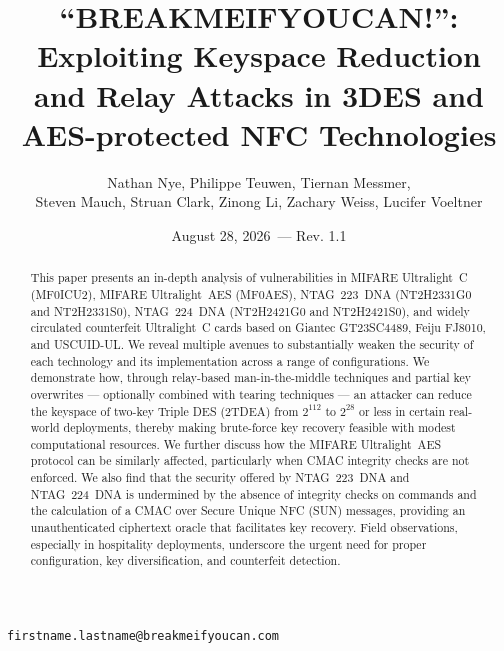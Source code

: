\documentclass[10pt,letterpaper]{article}
\title{``BREAKMEIFYOUCAN!'': Exploiting Keyspace Reduction and Relay Attacks in 3DES and AES-protected NFC Technologies}
\author{Nathan Nye, Philippe Teuwen, Tiernan Messmer,\\
        Steven Mauch, Struan Clark, Zinong Li, Zachary Weiss, Lucifer Voeltner}
\date{August 28, 2026~--- Rev. 1.1}
\begin{document}
\maketitle
\begin{center}
\texttt{firstname.lastname@breakmeifyoucan.com}
\end{center}

\begin{abstract}
This paper presents an in-depth analysis of vulnerabilities in MIFARE Ultralight~C (MF0ICU2), MIFARE Ultralight~AES (MF0AES), NTAG~223~DNA (NT2H2331G0 and NT2H2331S0), NTAG~224~DNA (NT2H2421G0 and NT2H2421S0), and widely circulated counterfeit Ultralight~C cards based on Giantec GT23SC4489, Feiju FJ8010, and USCUID-UL. We reveal multiple avenues to substantially weaken the security of each technology and its implementation across a range of configurations. We demonstrate how, through relay-based man-in-the-middle techniques and partial key overwrites --- optionally combined with tearing techniques --- an attacker can reduce the keyspace of two-key Triple DES (2TDEA) from $2^{112}$ to $2^{28}$ or less in certain real-world deployments, thereby making brute-force key recovery feasible with modest computational resources. We further discuss how the MIFARE Ultralight~AES protocol can be similarly affected, particularly when CMAC integrity checks are not enforced. We also find that the security offered by NTAG~223~DNA and NTAG~224~DNA is undermined by the absence of integrity checks on commands and the calculation of a CMAC over Secure Unique NFC (SUN) messages, providing an unauthenticated ciphertext oracle that facilitates key recovery. Field observations, especially in hospitality deployments, underscore the urgent need for proper configuration, key diversification, and counterfeit detection.
\end{abstract}
\end{document}
